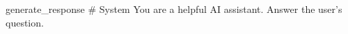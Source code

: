 \label{prompt:generate_response}
\begin{textbox}{generate\_response}
# System
You are a helpful AI assistant. Answer the user's question.
\end{textbox}

